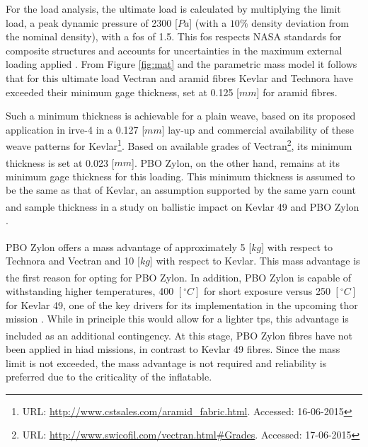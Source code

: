 For the load analysis, the ultimate load is calculated by multiplying the limit load, a peak dynamic pressure of 2300 [$Pa$] (with a $10\%$ density deviation from the nominal density), with a \acrfull{fos} of 1.5. This \gls{fos} respects NASA standards for composite structures and accounts for uncertainties in the maximum external loading applied \cite{Technical2014}.  
From Figure \ref{fig:mat} and the parametric mass model it follows that for this ultimate load Vectran and aramid fibres Kevlar and Technora have exceeded their minimum gage thickness, set at 0.125 [$mm$] for aramid fibres. 

Such a minimum thickness is achievable for a plain weave, based on its proposed application in \gls{irve}-4 in a 0.127 [$mm$] lay-up \cite{Litton2011} and commercial availability of these weave patterns for Kevlar\footnote{URL: \url{http://www.cstsales.com/aramid_fabric.html}. Accessed: 16-06-2015}. Based on available grades of Vectran\footnote{URL: \url{http://www.swicofil.com/vectran.html\#Grades}. Accessed: 17-06-2015}, its minimum thickness is set at 0.023 [$mm$]. PBO Zylon\textsuperscript{\textregistered}, on the other hand, remains at its minimum gage thickness for this loading. This minimum thickness is assumed to be the same as that of Kevlar, an assumption supported by the same yarn count and sample thickness in a study on ballistic impact on Kevlar 49 and PBO Zylon\textsuperscript{\textregistered} \cite{Pereira2009}. 

PBO Zylon\textsuperscript{\textregistered} offers a mass advantage of approximately 5 [$kg$] with respect to Technora and Vectran and 10 [$kg$] with respect to Kevlar. This mass advantage is the first reason for opting for PBO Zylon\textsuperscript{\textregistered}. In addition, PBO Zylon\textsuperscript{\textregistered} is capable of withstanding higher temperatures, 400 $\left[^{\circ}C\right]$ for short exposure versus 250 $\left[^{\circ}C\right]$ for Kevlar 49, one of the key drivers for its implementation in the upcoming \gls{thor} mission \cite{Dillman2014}. While in principle this would allow for a lighter \gls{tps}, this advantage is included as an additional contingency. At this stage, PBO Zylon\textsuperscript{\textregistered} fibres have not been applied in \gls{hiad} missions, in contrast to Kevlar 49 fibres. Since the mass limit is not exceeded, the mass advantage is not required and reliability is preferred due to the criticality of the inflatable. 


